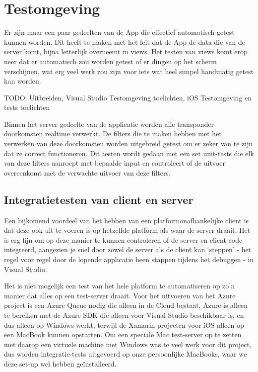 \section{Testomgeving}
Er zijn maar een paar gedeelten van de App die effectief automatisch getest kunnen worden. Dit heeft te maken met het feit dat de App de data die van de server komt, bijna letterlijk overneemt in views. Het testen van views komt erop neer dat er automatisch zou worden getest of er dingen op het scherm verschijnen, wat erg veel werk zou zijn voor iets wat heel simpel handmatig getest kan worden.

{\par \bigskip \par \color{red} TODO: Uitbreiden, Visual Studio Testomgeving toelichten, iOS Testomgeving en tests toelichten \par \bigskip \par }

Binnen het server-gedeelte van de applicatie worden alle transponder-doorkomsten realtime verwerkt. De filters die te maken hebben met het verwerken van deze doorkomsten worden uitgebreid getest om er zeker van te zijn dat ze correct functioneren. Dit testen wordt gedaan met een set unit-tests die elk van deze filters aanroept met bepaalde input en controleert of de uitvoer overeenkomt met de verwachte uitvoer van deze filters.

\subsection{Integratietesten van client en server}
Een bijkomend voordeel van het hebben van een platformonafhankelijke client is dat deze ook uit te voeren is op hetzelfde platform als waar de server draait. Het is erg fijn om op deze manier te kunnen controleren of de server en client code integreerd, aangezien je snel door zowel de server als de client kan `steppen' - het regel voor regel door de lopende applicatie heen stappen tijdens het debuggen - in Visual Studio.

Het is niet mogelijk een test van het hele platform te automatiseren op zo'n manier dat alles op een test-server draait. Voor het uitvoeren van het Azure project is een Azure Queue nodig die alleen in de Cloud bestaat. Azure is alleen te bereiken met de Azure SDK die alleen voor Visual Studio beschikbaar is, en dus alleen op Windows werkt, terwijl de Xamarin projecten voor iOS alleen op een MacBook kunnen opstarten. Om een speciale Mac test-server op te zetten met daarop een virtuele machine met Windows was te veel werk voor dit project, dus worden integratie-tests uitgevoerd op onze persoonlijke MacBooks, waar we deze set-up wel hebben geïnstalleerd.

